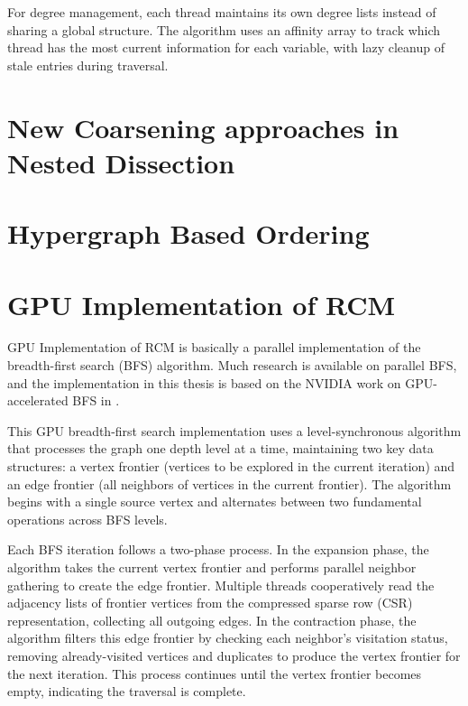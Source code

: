 For degree management, each thread maintains its own degree lists instead of sharing a global structure. The algorithm uses an affinity array to track which thread has the most current information for each variable, with lazy cleanup of stale entries during traversal.

\section{New Coarsening approaches in Nested Dissection}

\section{Hypergraph Based Ordering}

\section{GPU Implementation of RCM}

GPU Implementation of RCM is basically a parallel implementation of the breadth-first search (BFS) algorithm. Much research is available on parallel BFS, and the implementation in this thesis is based on the NVIDIA work on GPU-accelerated BFS in \cite{merrill_scalable_nodate}.

This GPU breadth-first search implementation uses a level-synchronous algorithm that processes the graph one depth level at a time, maintaining two key data structures: a vertex frontier (vertices to be explored in the current iteration) and an edge frontier (all neighbors of vertices in the current frontier). The algorithm begins with a single source vertex and alternates between two fundamental operations across BFS levels.

Each BFS iteration follows a two-phase process. In the expansion phase, the algorithm takes the current vertex frontier and performs parallel neighbor gathering to create the edge frontier. Multiple threads cooperatively read the adjacency lists of frontier vertices from the compressed sparse row (CSR) representation, collecting all outgoing edges. In the contraction phase, the algorithm filters this edge frontier by checking each neighbor's visitation status, removing already-visited vertices and duplicates to produce the vertex frontier for the next iteration. This process continues until the vertex frontier becomes empty, indicating the traversal is complete.


